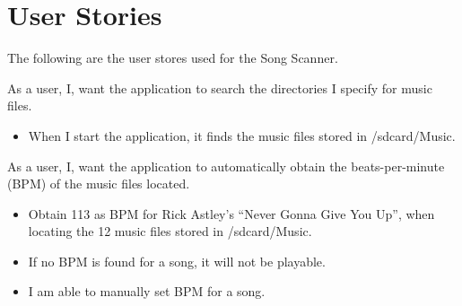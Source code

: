 \section{User Stories}
The following are the user stores used for the Song Scanner.

{As a user, I, want the application to search the directories I specify for music files.}
{\begin{itemize}
\item When I start the application, it finds the music files stored in /sdcard/Music.
\end{itemize}}

{As a user, I, want the application to automatically obtain the beats-per-minute (BPM) of the music files located.}
{\begin{itemize}
\item Obtain 113 as BPM for Rick Astley's ``Never Gonna Give You Up'', when locating the 12 music files stored in /sdcard/Music.
\item If no BPM is found for a song, it will not be playable.
\item I am able to manually set BPM for a song.
\end{itemize}}